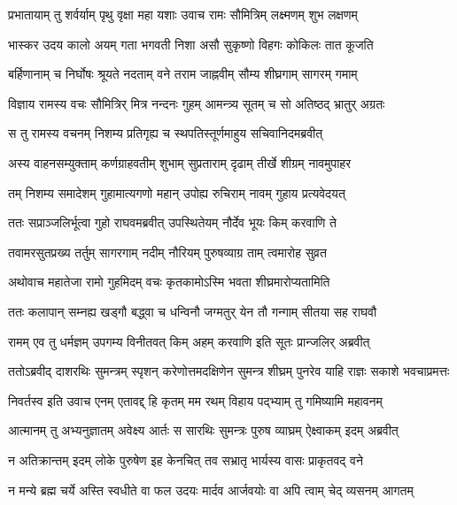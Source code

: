 
\twolineshloka
{प्रभातायाम् तु शर्वर्याम् पृथु वृक्षा महा यशाः}
{उवाच रामः सौमित्रिम् लक्ष्मणम् शुभ लक्षणम्} %

\twolineshloka
{भास्कर उदय कालो अयम् गता भगवती निशा}
{असौ सुकृष्णो विहगः कोकिलः तात कूजति} %

\twolineshloka
{बर्हिणानाम् च निर्घोषः श्रूयते नदताम् वने}
{तराम जाह्नवीम् सौम्य शीघ्रगाम् सागरम् गमाम्} %

\twolineshloka
{विज्ञाय रामस्य वचः सौमित्रिर् मित्र नन्दनः}
{गुहम् आमन्त्र्य सूतम् च सो अतिष्ठद् भ्रातुर् अग्रतः} %

\twolineshloka
{स तु रामस्य वचनम् निशम्य प्रतिगृह्य च}
{स्थपतिस्तूर्णमाहुय सचिवानिदमब्रवीत्} %

\twolineshloka
{अस्य वाहनसम्युक्ताम् कर्णग्राहवतीम् शुभाम्}
{सुप्रताराम् दृढाम् तीर्खे शीग्रम् नावमुपाहर} %

\twolineshloka
{तम् निशम्य समादेशम् गुहामात्यगणो महान्}
{उपोह्य रुचिराम् नावम् गुहाय प्रत्यवेदयत्} %

\twolineshloka
{ततः सप्राञ्जलिर्भूत्वा गुहो राघवमब्रवीत्}
{उपस्थितेयम् नौर्देव भूयः किम् करवाणि ते} %

\twolineshloka
{तवामरसुतप्रख्य तर्तुम् सागरगाम् नदीम्}
{नौरियम् पुरुषव्याग्र ताम् त्वमारोह सुव्रत} %

\twolineshloka
{अथोवाच महातेजा रामो गुहमिदम् वचः}
{कृतकामोऽस्मि भवता शीघ्रमारोप्यतामिति} %

\twolineshloka
{ततः कलापान् सम्नह्य खड्गौ बद्ध्वा च धन्विनौ}
{जग्मतुर् येन तौ गन्गाम् सीतया सह राघवौ} %

\twolineshloka
{रामम् एव तु धर्मज्ञम् उपगम्य विनीतवत्}
{किम् अहम् करवाणि इति सूतः प्रान्जलिर् अब्रवीत्} %

\fourlineindentedshloka
{ततोऽब्रवीद् दाशरथिः सुमन्त्रम्}
{स्पृशन् करेणोत्तमदक्षिणेन}
{सुमन्त्र शीघ्रम् पुनरेव याहि}
{राज्ञः सकाशे भवचाप्रमत्तः} %

\twolineshloka
{निवर्तस्व इति उवाच एनम् एतावद्द् हि कृतम् मम}
{रथम् विहाय पद्भ्याम् तु गमिष्यामि महावनम्} %

\twolineshloka
{आत्मानम् तु अभ्यनुज्ञातम् अवेक्ष्य आर्तः स सारथिः}
{सुमन्त्रः पुरुष व्याघ्रम् ऐक्ष्वाकम् इदम् अब्रवीत्} %

\twolineshloka
{न अतिक्रान्तम् इदम् लोके पुरुषेण इह केनचित्}
{तव सभ्रातृ भार्यस्य वासः प्राकृतवद् वने} %

\twolineshloka
{न मन्ये ब्रह्म चर्ये अस्ति स्वधीते वा फल उदयः}
{मार्दव आर्जवयोः वा अपि त्वाम् चेद् व्यसनम् आगतम्} %

